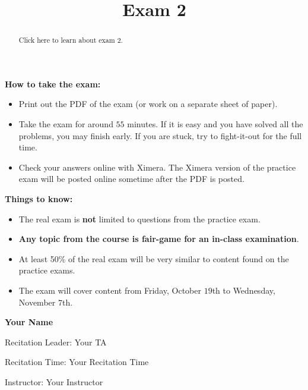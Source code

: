 \documentclass{ximera}
\title{Exam 2}
\begin{document}
\begin{abstract}
Click here to learn about exam 2.
\end{abstract}
\maketitle

\thispagestyle{empty}


\vfill

\textbf{How to take the exam:}
\begin{itemize}
  \item Print out the PDF of the exam (or work on a separate sheet of paper).
  \item Take the exam for around $55$ minutes. If it is easy and you
    have solved all the problems, you may finish early. If you are
    stuck, try to fight-it-out for the full time.
  \item Check your answers online with Ximera. The Ximera version of
    the practice exam will be posted online sometime after the PDF is
    posted.
\end{itemize}

\textbf{Things to know:}
\begin{itemize}
\item The real exam is \textbf{not} limited to questions from the practice
  exam.
\item \textbf{Any topic from the course is fair-game for an in-class
  examination}.
\item At least 50\% of the real exam will be very similar to content
  found on the practice exams.
\item The exam will cover content from Friday, October $19$th to
  Wednesday, November $7$th.
\end{itemize}

\noindent\textsf{{\fontsize{32}{36}\textbf{Your Name}}} 

\vspace{1cm}

\noindent\textsf{\large Recitation Leader: Your TA} 


\noindent\textsf{\large Recitation Time: Your Recitation Time} 


\noindent\textsf{\large Instructor: Your Instructor}


\end{document}
